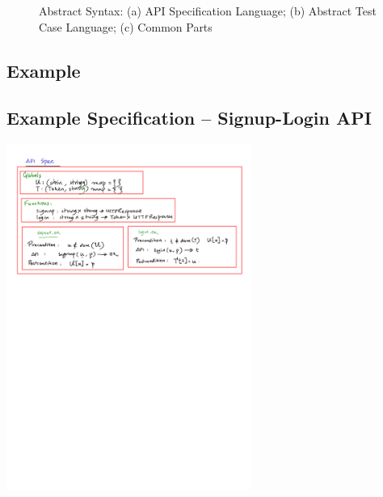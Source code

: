 \documentclass[12pts, a4paper]{article}
\begin{document}
\begin{figure}
%
%
%
%
\caption{Abstract Syntax: (a) API Specification Language; (b) Abstract Test Case Language; (c) Common Parts}
\label{f:abssyn}
\end{figure}

\subsection{Example}
\subsection{Example Specification -- Signup-Login API}
\begin{center}
\includegraphics[width=0.6\textwidth]{images/spec-AST-1.png}
\end{center}
\end{document}
